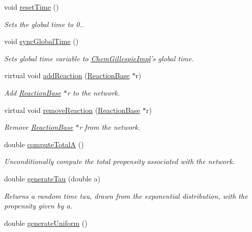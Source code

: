 \begin{DoxyCompactItemize}
void \hyperlink{classChemGillespieImpl_a21fcdf4c1f9c8372ebf292c5b4006b4a}{reset\+Time} ()
\begin{DoxyCompactList}\small\item\em Sets the global time to 0.. \end{DoxyCompactList}\item 
void \hyperlink{classChemGillespieImpl_ae1fb14fb7f6eaa6a3ce21c8917de4624}{sync\+Global\+Time} ()
\begin{DoxyCompactList}\small\item\em Sets global time variable to \hyperlink{classChemGillespieImpl}{Chem\+Gillespie\+Impl}'s global time. \end{DoxyCompactList}\item 
virtual void \hyperlink{classChemGillespieImpl_afc2764e90e24e70b48577525421815c0}{add\+Reaction} (\hyperlink{classReactionBase}{Reaction\+Base} $\ast$r)
\begin{DoxyCompactList}\small\item\em Add \hyperlink{classReactionBase}{Reaction\+Base} $\ast$r to the network. \end{DoxyCompactList}\item 
virtual void \hyperlink{classChemGillespieImpl_ad818d065b15a17427793ab099ee987a8}{remove\+Reaction} (\hyperlink{classReactionBase}{Reaction\+Base} $\ast$r)
\begin{DoxyCompactList}\small\item\em Remove \hyperlink{classReactionBase}{Reaction\+Base} $\ast$r from the network. \end{DoxyCompactList}\item 
double \hyperlink{classChemGillespieImpl_a9a5292f5ede270611175f2061ef5d2c1}{compute\+Total\+A} ()
\begin{DoxyCompactList}\small\item\em Unconditionally compute the total propensity associated with the network. \end{DoxyCompactList}\item 
double \hyperlink{classChemGillespieImpl_ae2a584042f976aa39399b700011abe43}{generate\+Tau} (double a)
\begin{DoxyCompactList}\small\item\em Returns a random time tau, drawn from the exponential distribution, with the propensity given by a. \end{DoxyCompactList}\item 
double \hyperlink{classChemGillespieImpl_a165ea88d8e31bbd994f6b81a4ceda67e}{generate\+Uniform} ()

\end{DoxyCompactItemize}
